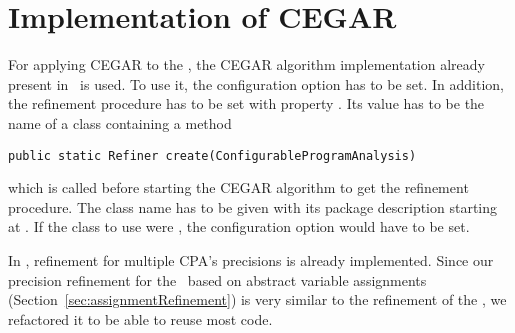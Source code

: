 \chapter{Implementation of CEGAR}
For applying CEGAR to the \symbolicExecutionCPA, the CEGAR algorithm implementation already present in \cpaChecker\ is used.
To use it, the configuration option  has to be set.
In addition, the refinement procedure has to be set with property .
Its value has to be the name of a class containing a method
\begin{lstlisting}
public static Refiner create(ConfigurableProgramAnalysis)
\end{lstlisting}
which is called before starting the CEGAR algorithm to get the refinement procedure.
The class name has to be given with its package description starting at
.
If the class to use were
,
the configuration option  would have to be set.

In \cpaChecker, refinement for multiple CPA's precisions is already implemented.
Since our precision refinement for the \symbolicExecutionCPA\ based on abstract variable assignments (Section~\ref{sec:assignmentRefinement}) is very similar to the refinement of the , we refactored it to be able to reuse most code.



